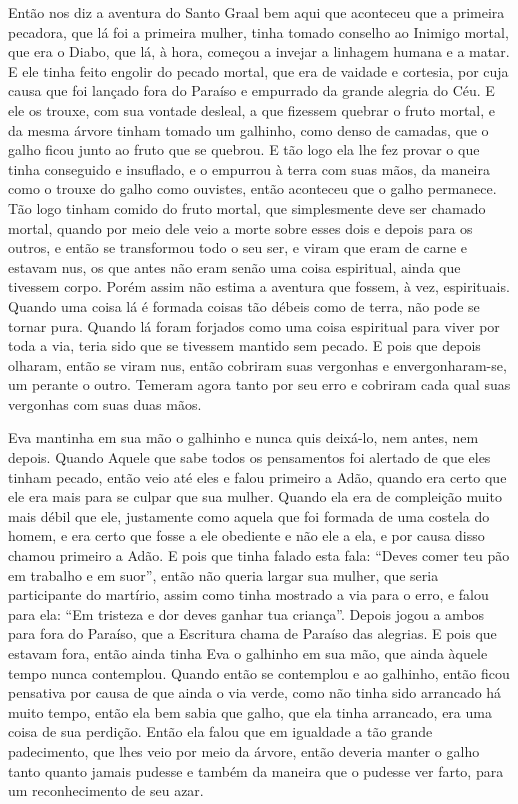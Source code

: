 Então nos diz a aventura do Santo Graal bem aqui que aconteceu que a primeira
pecadora, que lá foi a primeira mulher, tinha tomado conselho ao Inimigo
mortal, que era o Diabo, que lá, à hora, começou a invejar a linhagem humana e
a matar. E ele tinha feito engolir do pecado mortal, que era de vaidade e
cortesia, por cuja causa que foi lançado fora do Paraíso e empurrado da grande
alegria do Céu. E ele os trouxe, com sua vontade desleal, a que fizessem
quebrar o fruto mortal, e da mesma árvore tinham tomado um galhinho, como denso
de camadas, que o galho ficou junto ao fruto que se quebrou. E tão logo ela lhe
fez provar o que tinha conseguido e insuflado, e o empurrou à terra com suas
mãos, da maneira como o trouxe do galho como ouvistes, então aconteceu que o
galho permanece. Tão logo tinham comido do fruto mortal, que simplesmente deve
ser chamado mortal, quando por meio dele veio a morte sobre esses dois e depois
para os outros, e então se transformou todo o seu ser, e viram que eram de
carne e estavam nus, os que antes não eram senão uma coisa espiritual, ainda
que tivessem corpo. Porém assim não estima a aventura que fossem, à vez,
espirituais. Quando uma coisa lá é formada coisas tão débeis como de terra, não
pode se tornar pura. Quando lá foram forjados como uma coisa espiritual para
viver por toda a via, teria sido que se tivessem mantido sem pecado. E pois que
depois olharam, então se viram nus, então cobriram suas vergonhas e
envergonharam-se, um perante o outro. Temeram agora tanto por seu erro e
cobriram cada qual suas vergonhas com suas duas mãos.

Eva mantinha em sua mão o galhinho e nunca quis deixá-lo, nem antes, nem depois.
Quando Aquele que sabe todos os pensamentos foi alertado de que eles tinham
pecado, então veio até eles e falou primeiro a Adão, quando era certo que ele
era mais para se culpar que sua mulher. Quando ela era de compleição muito mais
débil que ele, justamente como aquela que foi formada de uma costela do homem,
e era certo que fosse a ele obediente e não ele a ela, e por causa disso chamou
primeiro a Adão. E pois que tinha falado esta fala: “Deves comer teu pão em
trabalho e em suor”, então não queria largar sua mulher, que seria participante
do martírio, assim como tinha mostrado a via para o erro, e falou para ela: “Em
tristeza e dor deves ganhar tua criança”. Depois jogou a ambos para fora do
Paraíso, que a Escritura chama de Paraíso das alegrias. E pois que estavam
fora, então ainda tinha Eva o galhinho em sua mão, que ainda àquele tempo nunca
contemplou. Quando então se contemplou e ao galhinho, então ficou pensativa por
causa de que ainda o via verde, como não tinha sido arrancado há muito tempo,
então ela bem sabia que galho, que ela tinha arrancado, era uma coisa de sua
perdição. Então ela falou que em igualdade a tão grande padecimento, que lhes
veio por meio da árvore, então deveria manter o galho tanto quanto jamais
pudesse e também da maneira que o pudesse ver farto, para um reconhecimento de
seu azar.


